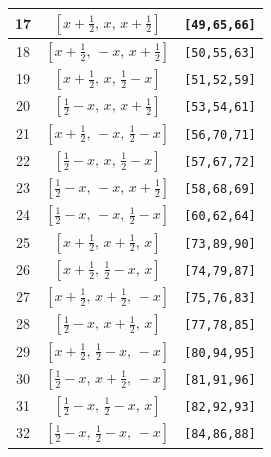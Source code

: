 \documentclass[fleqn,8pt]{jsarticle}
\begin{document}
\begin{longtable}{ccc}
17 & $\left[ x + \frac{1}{2},\, x,\, x + \frac{1}{2} \right]$ & {\tt [49,65,66]} \\ \hline
18 & $\left[ x + \frac{1}{2},\, - x,\, x + \frac{1}{2} \right]$ & {\tt [50,55,63]} \\ \hline
19 & $\left[ x + \frac{1}{2},\, x,\, \frac{1}{2} - x \right]$ & {\tt [51,52,59]} \\ \hline
20 & $\left[ \frac{1}{2} - x,\, x,\, x + \frac{1}{2} \right]$ & {\tt [53,54,61]} \\ \hline
21 & $\left[ x + \frac{1}{2},\, - x,\, \frac{1}{2} - x \right]$ & {\tt [56,70,71]} \\ \hline
22 & $\left[ \frac{1}{2} - x,\, x,\, \frac{1}{2} - x \right]$ & {\tt [57,67,72]} \\ \hline
23 & $\left[ \frac{1}{2} - x,\, - x,\, x + \frac{1}{2} \right]$ & {\tt [58,68,69]} \\ \hline
24 & $\left[ \frac{1}{2} - x,\, - x,\, \frac{1}{2} - x \right]$ & {\tt [60,62,64]} \\ \hline
25 & $\left[ x + \frac{1}{2},\, x + \frac{1}{2},\, x \right]$ & {\tt [73,89,90]} \\ \hline
26 & $\left[ x + \frac{1}{2},\, \frac{1}{2} - x,\, x \right]$ & {\tt [74,79,87]} \\ \hline
27 & $\left[ x + \frac{1}{2},\, x + \frac{1}{2},\, - x \right]$ & {\tt [75,76,83]} \\ \hline
28 & $\left[ \frac{1}{2} - x,\, x + \frac{1}{2},\, x \right]$ & {\tt [77,78,85]} \\ \hline
29 & $\left[ x + \frac{1}{2},\, \frac{1}{2} - x,\, - x \right]$ & {\tt [80,94,95]} \\ \hline
30 & $\left[ \frac{1}{2} - x,\, x + \frac{1}{2},\, - x \right]$ & {\tt [81,91,96]} \\ \hline
31 & $\left[ \frac{1}{2} - x,\, \frac{1}{2} - x,\, x \right]$ & {\tt [82,92,93]} \\ \hline
32 & $\left[ \frac{1}{2} - x,\, \frac{1}{2} - x,\, - x \right]$ & {\tt [84,86,88]} \\
\end{longtable}
\renewcommand{\arraystretch}{1.2}
\end{document}

